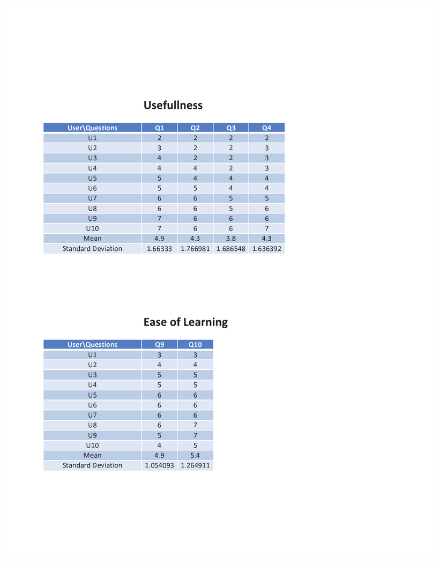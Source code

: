 \begin{appendices}
\begin{figure}[h!t]
    \centering
      \includegraphics[width=5.6in]{ch5/Result/Desktop/1.pdf}
  \label{fig:Result:Usefulness:EaseofLearning:Desktop}
\end{figure}


\end{appendices}
